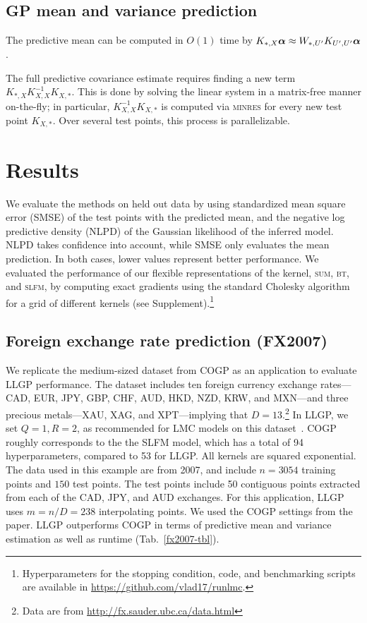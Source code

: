\documentclass{article}
\begin{document}
\subsection{GP mean and variance prediction}

The predictive mean can be computed in $O(1)$ time by $K_{*,X}{\boldsymbol\alpha}\approx W_{*,{U'}}K_{{U'},{U'}}{\boldsymbol\alpha}$ \cite{msgp}.

The full predictive covariance estimate requires finding a new term $K_{*,X}K_{X,X}^{-1}K_{X,*}$. This is done by solving the linear system in a matrix-free manner on-the-fly; in particular, $K_{X,X}^{-1}K_{X,*}$ is computed via \textsc{minres} for every new test point $K_{X,*}$. Over several test points, this process is parallelizable.

\section{Results}
\label{sec:results}
We evaluate the methods on held out data by using standardized mean square error (SMSE) of the test points with the predicted mean, and the negative log predictive density (NLPD) of the Gaussian likelihood of the inferred model. NLPD takes confidence into account, while SMSE only evaluates the mean prediction. In both cases, lower values represent better performance. We evaluated the performance of our flexible representations of the kernel, \textsc{sum}, \textsc{bt}, and \textsc{slfm}, by computing exact gradients using the standard Cholesky algorithm for a grid of different kernels (see Supplement).\footnote{Hyperparameters for the stopping condition, code, and benchmarking scripts are available in
\url{https://github.com/vlad17/runlmc}.} %
\subsection{Foreign exchange rate prediction (FX2007)}\label{fx2007-results}

We replicate the medium-sized dataset from COGP as an application to evaluate LLGP performance. The dataset includes ten foreign currency exchange rates---CAD, EUR, JPY, GBP, CHF, AUD, HKD, NZD, KRW, and MXN---and three precious metals---XAU, XAG, and XPT---implying that $D=13$.\footnote{Data are from \url{http://fx.sauder.ubc.ca/data.html}} In LLGP, we set $Q=1,R=2$, as recommended for LMC models on this dataset~\cite{alvarez2010efficient}. COGP roughly corresponds to the the SLFM model, which has a total of 94 hyperparameters, compared to 53 for LLGP. All kernels are squared exponential. The data used in this example are from 2007, and include $n=3054$ training points and $150$ test points. The test points include 50 contiguous points extracted from each of the CAD, JPY, and AUD exchanges. For this application, LLGP uses $m=n/D=238$ interpolating points. We used the COGP settings from the paper. LLGP outperforms COGP in terms of predictive mean and variance estimation as well as runtime (Tab.~\ref{fx2007-tbl}).
\end{document}
